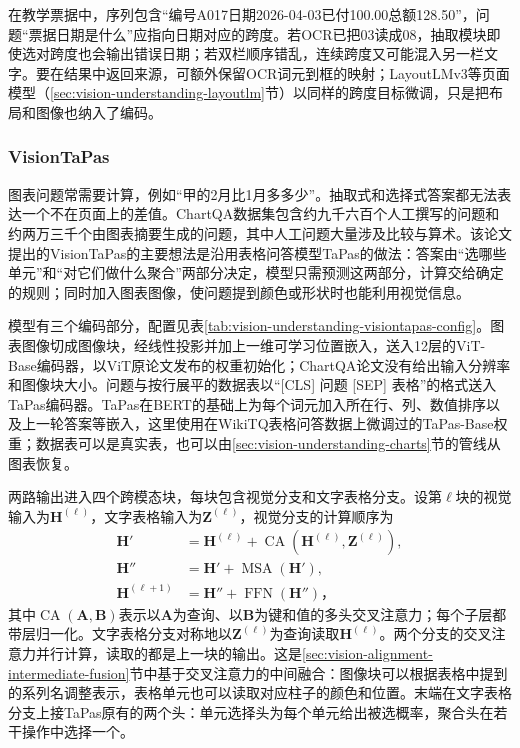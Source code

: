 在教学票据中，序列包含“编号A017日期2026-04-03已付100.00总额128.50”，问题“票据日期是什么”应指向日期对应的跨度。若OCR已把03读成08，抽取模块即使选对跨度也会输出错误日期；若双栏顺序错乱，连续跨度又可能混入另一栏文字。要在结果中返回来源，可额外保留OCR词元到框的映射；LayoutLMv3等页面模型（\ref{sec:vision-understanding-layoutlm}节）以同样的跨度目标微调，只是把布局和图像也纳入了编码。

\subsubsection{VisionTaPas}
\label{sec:vision-understanding-visiontapas}

图表问题常需要计算，例如“甲的2月比1月多多少”。抽取式和选择式答案都无法表达一个不在页面上的差值。ChartQA数据集包含约九千六百个人工撰写的问题和约两万三千个由图表摘要生成的问题，其中人工问题大量涉及比较与算术。该论文提出的VisionTaPas的主要想法是沿用表格问答模型TaPas的做法：答案由“选哪些单元”和“对它们做什么聚合”两部分决定，模型只需预测这两部分，计算交给确定的规则；同时加入图表图像，使问题提到颜色或形状时也能利用视觉信息。

模型有三个编码部分，配置见表\ref{tab:vision-understanding-visiontapas-config}。图表图像切成图像块，经线性投影并加上一维可学习位置嵌入，送入12层的ViT-Base编码器，以ViT原论文发布的权重初始化；ChartQA论文没有给出输入分辨率和图像块大小。问题与按行展平的数据表以“[CLS] 问题 [SEP] 表格”的格式送入TaPas编码器。TaPas在BERT的基础上为每个词元加入所在行、列、数值排序以及上一轮答案等嵌入，这里使用在WikiTQ表格问答数据上微调过的TaPas-Base权重；数据表可以是真实表，也可以由\ref{sec:vision-understanding-charts}节的管线从图表恢复。

两路输出进入四个跨模态块，每块包含视觉分支和文字表格分支。设第$\ell$块的视觉输入为$\bm H^{(\ell)}$，文字表格输入为$\bm Z^{(\ell)}$，视觉分支的计算顺序为
\[
 \begin{aligned}
  \bm H'&=\bm H^{(\ell)}+\operatorname{CA}(\bm H^{(\ell)},\bm Z^{(\ell)}),\\
  \bm H''&=\bm H'+\operatorname{MSA}(\bm H'),\\
  \bm H^{(\ell+1)}&=\bm H''+\operatorname{FFN}(\bm H'')\text{，}
 \end{aligned}
\]
其中$\operatorname{CA}(\bm A,\bm B)$表示以$\bm A$为查询、以$\bm B$为键和值的多头交叉注意力；每个子层都带层归一化。文字表格分支对称地以$\bm Z^{(\ell)}$为查询读取$\bm H^{(\ell)}$。两个分支的交叉注意力并行计算，读取的都是上一块的输出。这是\ref{sec:vision-alignment-intermediate-fusion}节中基于交叉注意力的中间融合：图像块可以根据表格中提到的系列名调整表示，表格单元也可以读取对应柱子的颜色和位置。末端在文字表格分支上接TaPas原有的两个头：单元选择头为每个单元给出被选概率，聚合头在若干操作中选择一个。

